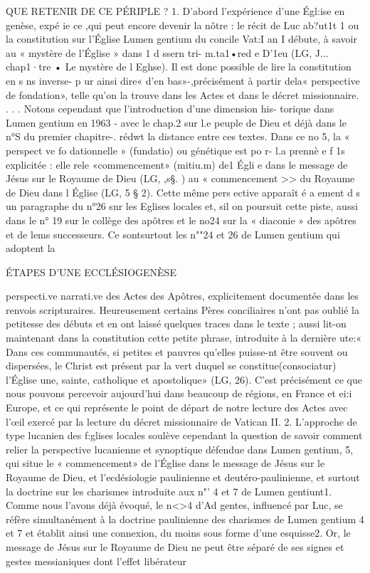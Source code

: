 QUE RETENIR DE CE PÉRIPLE ?
1.	D'abord l'expérience d'une Égl:ise en genèse, expé ie ce ,qui peut encore devenir la nôtre : le récit de Luc ab?ut1t 1 ou la constitution sur l'Église Lumen gentium du concile Vat:I an I débute, à savoir au « mystère de l'Église » dans 1  d ssern tri-
m.ta1•red e D'1eu (LG, J... chap1·tre • Le mystère de l Eghse). Il est
donc possible de lire la constitution en s ns inverse-  p ur ainsi dire« d'en bas»-,précisément à partir dela« perspective de fondation», telle qu'on la trouve dans les Actes et dans le
décret missionnaire.	.  . . Notons cependant que l'introduction d'une dimension his-
torique dans Lumen gentium en 1963 - avec le chap.2 sur l.e peuple de Dieu et déjà dans le n°S du premier chapitre-. rédwt la distance entre ces textes. Dans ce no 5, la « perspect ve fo dationnelle » (fundatio) ou génétique est po r- l.a prennè e f 1s explicitée : elle re\ie le «commencement» (mitiu.m) de1 Égli e
dans le message de Jésus sur le Royaume de Dieu (LG, ,s§.  )
au «	commencement >> du	Royaume de Dieu dans l Église (LG, 5 § 2). Cette même pers ective apparaît é a ement d s un paragraphe du n°26 snr les Eglises locales et, sil on poursuit cette piste, aussi dans le n° 19 sur le collège des apôtres et le no24 sur la « diaconie » des apôtres et de lems successeurs. Ce sontsurtout les n""24 et 26 de Lumen gentium qui adoptent la
 
ÉTAPES D'UNE ECCLÉSIOGENÈSE

perspecti.ve narrati.ve des Actes des Apôtres, explicitement documentée dans les renvois scripturaires. Heureusement certains Pères conciliaires n'ont pas oublié la petitesse des débuts et en ont laissé quelques traces dans le texte ; aussi lit-on maintenant dans la constitution cette petite phrase, introduite à la dernière ute:« Dans ces communautés, si petites et pauvres qu'elles puisse-nt être souvent ou dispersées, le Christ est présent par la vert duquel se constitue(consociatur) l'Église une, sainte, catholique et apostolique» (LG, 26). C'est précisément ce que nous pouvons percevoir aujourd'hui dans beaucoup de régions, en France et ei:i Europe, et ce qui représente le point de départ de
notre lecture des Actes avec l'œil exercé par la lecture du décret missionnaire de Vatican II.
2.	L'approche de type lucanien des f:glises locales soulève cependant la question de savoir comment relier la perspective lucanienne et synoptique défendue dans Lumen gentium, 5, qui situe le « commencement» de l'Église dans le message de Jésus sur le Royaume de Dieu, et l'ecdésiologie paulinienne et deutéro-paulinienne, et surtout la doctrine sur les charismes introduite aux n"' 4 et 7 de Lumen gentiunt1. Comme nous l'avons déjà évoqué, le n<>4 d'Ad gentes, influencé par Luc, se réfère simultanément à la doctrine paulinienne des charismes de
Lumen gentium 4 et 7 et établit ainsi une connexion, du moins sous forme d'une esquisse2.
Or, le message de Jésus sur le Royaume de Dieu ne peut être séparé de ses signes et gestes messianiques dont l'effet libérateur

